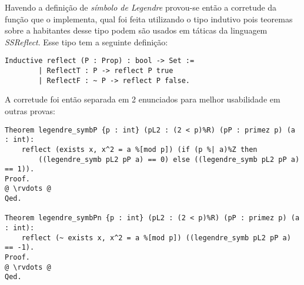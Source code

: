 Havendo a definição de \textit{símbolo de Legendre} provou-se então a corretude da função que o implementa, qual foi feita utilizando o tipo indutivo  pois teoremas sobre a habitantes desse tipo podem são usados em táticas da linguagem \textit{SSReflect}. Esse tipo tem a seguinte definição:
        \begin{lstlisting}[language=coq,frame=single,tabsize=1]
Inductive reflect (P : Prop) : bool -> Set :=
        | ReflectT : P -> reflect P true
        | ReflectF : ~ P -> reflect P false.
        \end{lstlisting}
A corretude foi então separada em 2 enunciados para melhor usabilidade em outras provas:
        \begin{lstlisting}[language=coq,frame=single,tabsize=1, escapechar=@]
Theorem legendre_symbP {p : int} (pL2 : (2 < p)%R) (pP : primez p) (a : int):
    reflect (exists x, x^2 = a %[mod p]) (if (p %| a)%Z then
        ((legendre_symb pL2 pP a) == 0) else ((legendre_symb pL2 pP a) == 1)).
Proof.
@ \rvdots @
Qed.

Theorem legendre_symbPn {p : int} (pL2 : (2 < p)%R) (pP : primez p) (a : int):
    reflect (~ exists x, x^2 = a %[mod p]) ((legendre_symb pL2 pP a) == -1).
Proof.
@ \rvdots @
Qed.
        \end{lstlisting}
        
